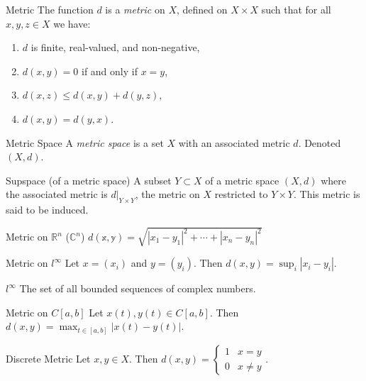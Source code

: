 \documentclass[avery5388,grid,frame]{flashcards}
\begin{document}

\begin{flashcard}[Definition]{Metric}
The function $d$ is a \emph{metric} on $X$, defined on $X\times X$ such that for all $x,y,z\in X$ we have:
\begin{enumerate}
\item $d$ is finite, real-valued, and non-negative,
\item $d(x,y)=0$ if and only if $x=y$,
\item $d(x,z)\leq d(x,y)+d(y,z)$,
\item $d(x,y)=d(y,x)$.
\end{enumerate}
\end{flashcard}

\begin{flashcard}[Definition]{Metric Space}
A \emph{metric space} is a set $X$ with an associated metric $d$. Denoted $(X,d)$.
\end{flashcard}

\begin{flashcard}[Definition]{Supspace (of a metric space)}
A subset $Y\subset X$ of a metric space $(X,d)$ where the associated metric is $d|_{Y\times Y}$, the metric on $X$ restricted to $Y\times Y$. This metric is said to be induced.
\end{flashcard}

\begin{flashcard}[Example]{Metric on $\mathbb{R}^n$ ($\mathbb{C}^n$)}
$d(\mathbb{x},\mathbb{y})=\sqrt{|x_1-y_1|^2+\dotsb+|x_n-y_n|^2}$
\end{flashcard}

\begin{flashcard}[Example]{Metric on $l^\infty$}
Let $x=(x_i)$ and $y=(y_i)$. Then $d(x,y)=\sup_i|x_i-y_i|$.
\end{flashcard}

\begin{flashcard}[Definition]{$l^\infty$}
The set of all bounded sequences of complex numbers.
\end{flashcard}

\begin{flashcard}[Example]{Metric on $C[a,b]$}
Let $x(t),y(t)\in C[a,b]$. Then $d(x,y)=\max_{t\in[a,b]}|x(t)-y(t)|$.
\end{flashcard}

\begin{flashcard}[Example]{Discrete Metric}
Let $x,y\in X$. Then $d(x,y)=\begin{cases}1&x=y\\0&x\neq y\end{cases}$.
\end{flashcard}
\end{document}
